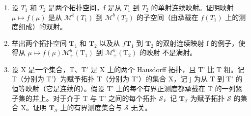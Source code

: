 \exercisesection{}

\begin{enumerate}
\def\labelenumi{\arabic{enumi})}
\item
  设 \(T_{1}\) 和 \(T_{2}\) 是两个拓扑空间，f 是从 \(T_{1}\) 到 \(T_{2}\) 的单射连续映射。证明映射 \(\mu \mapsto f(\mu)\) 是从 \(\mathcal{M}^{b}(T_{1})\) 到 \(\mathcal{M}^{b}(T_{2})\) 的子空间（由承载在 \(f(T_{1})\) 上的测度组成）的双射。
\item
  举出两个拓扑空间 \(\mathbf{T}_1\) 和 \(\mathbf{T}_2\) 以及从 \(f\)\(\mathbf{T}_1\) 到 \(\mathbf{T}_2\) 的双射连续映射 f 的例子，使得从 \(\mu \mapsto f(\mu)\)\(\mathcal{M}_+^b (\mathrm{T}_1)\) 到 \(\mathcal{M}_+^b (\mathrm{T}_2)\) 的映射  不是满射。
\item
  设 X 是一个集合，T、T' 是 X 上的两个 Hausdorff 拓扑，且 T' 比 T 粗。记 T（分别为 T'）为赋予拓扑 T（分别为 T'）的集合 X，记 j 为从 T 到 T' 的恒等映射（它是连续的）。假设 T' 上的每个有界正测度都承载在 T 的一列紧子集的并上。对于介于 T 与 T' 之间的每个拓扑 \(\mathcal{S}\)，记 \(\mathbf{T}_{\mathcal{S}}\) 为赋予拓扑 \(\mathcal{S}\) 的集合 X。证明 \(\mathbf{T}_{\mathcal{S}}\) 上的有界测度集合与 \(\mathcal{S}\) 无关。
\end{enumerate}
